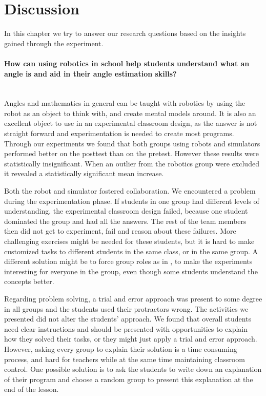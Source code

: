 \section{Discussion}
In this chapter we try to answer our research questions based on the insights gained through the experiment. 

\paragraph{How can using robotics in school help students understand what an angle is and aid in their angle estimation skills?}~\\
Angles and mathematics in general can be taught with robotics by using the robot as an object to think with, and create mental models around. It is also an excellent object to use in an experimental classroom design, as the answer is not straight forward and experimentation is needed to create most programs. Through our experiments we found that both groups using robots and simulators performed better on the posttest than on the pretest. However these results were statistically insignificant. When an outlier from the robotics group were excluded it revealed a statistically significant mean increase. 

\bigskip\noindent
Both the robot and simulator fostered collaboration. We encountered a problem during the experimentation phase. If students in one group had different levels of understanding, the experimental classroom design failed, because one student dominated the group and had all the answers. The rest of the team members then did not get to experiment, fail and reason about these failures. More challenging exercises might be needed for these students, but it is hard to make customized tasks to different students in the same class, or in the same group. A different solution might be to force group roles as in \cite{mitnik2009collaborative}, to make the experiments interesting for everyone in the group, even though some students understand the concepts better.

\bigskip\noindent
Regarding problem solving, a trial and error approach was present to some degree in all groups and the students used their protractors wrong. The activities we presented did not alter the students' approach. We found that overall students need clear instructions and should be presented with opportunities to explain how they solved their tasks, or they might just apply a trial and error approach. However, asking every group to explain their solution is a time consuming process, and hard for teachers while at the same time maintaining classroom control. One possible solution is to ask the students to write down an explanation of their program and choose a random group to present this explanation at the end of the lesson.

